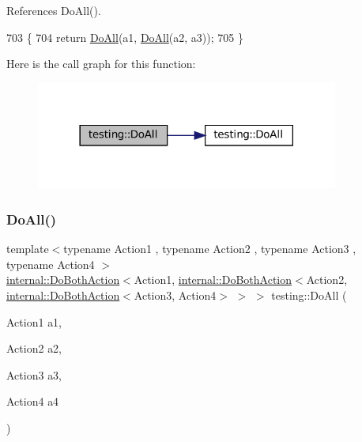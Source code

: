 References Do\+All().


\begin{DoxyCode}
703                                           \{
704   \textcolor{keywordflow}{return} \hyperlink{namespacetesting_a79ac222c485c7aa0a1774bee17dadb10}{DoAll}(a1, \hyperlink{namespacetesting_a79ac222c485c7aa0a1774bee17dadb10}{DoAll}(a2, a3));
705 \}
\end{DoxyCode}
Here is the call graph for this function\+:
\nopagebreak
\begin{figure}[H]
\begin{center}
\leavevmode
\includegraphics[width=282pt]{namespacetesting_ad6a3ce5e229120ea287286a86394d712_cgraph}
\end{center}
\end{figure}
\mbox{\label{namespacetesting_a790ce08c80a1f8ececa0f2a4f678247c}} 
\subsubsection{\texorpdfstring{Do\+All()}{DoAll()}\hspace{0.1cm}{\footnotesize\ttfamily [3/9]}}
{\footnotesize\ttfamily template$<$typename Action1 , typename Action2 , typename Action3 , typename Action4 $>$ \\
\hyperlink{classtesting_1_1internal_1_1DoBothAction}{internal\+::\+Do\+Both\+Action}$<$Action1, \hyperlink{classtesting_1_1internal_1_1DoBothAction}{internal\+::\+Do\+Both\+Action}$<$Action2, \hyperlink{classtesting_1_1internal_1_1DoBothAction}{internal\+::\+Do\+Both\+Action}$<$Action3, Action4$>$ $>$ $>$ testing\+::\+Do\+All (\begin{DoxyParamCaption}\item[{Action1}]{a1,  }\item[{Action2}]{a2,  }\item[{Action3}]{a3,  }\item[{Action4}]{a4 }\end{DoxyParamCaption})\hspace{0.3cm}{\ttfamily [inline]}}



